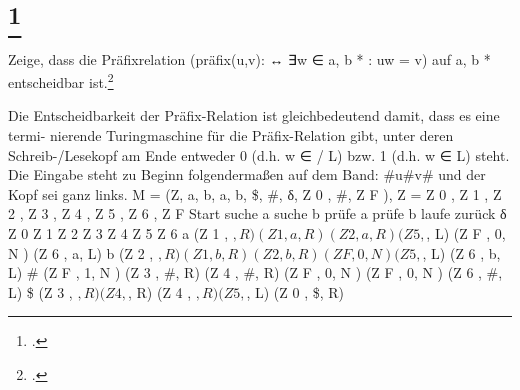 \documentclass{bschlangaul-aufgabe}
\begin{document}
\liAufgabenTitel{}
\section{
\footcite{66112:2002:03}}

Zeige, dass die Präﬁxrelation (präﬁx(u,v): ↔ ∃w ∈ {a, b} * : uw = v) auf {a, b} *
entscheidbar ist.\footcite[Aufgabe 7a)]{theo:ab:4}

Die Entscheidbarkeit der Präﬁx-Relation ist gleichbedeutend damit, dass es eine termi-
nierende Turingmaschine für die Präﬁx-Relation gibt, unter deren Schreib-/Lesekopf am
Ende entweder 0 (d.h. w ∈
/ L) bzw. 1 (d.h. w ∈ L) steht.
Die Eingabe steht zu Beginn folgendermaßen auf dem Band: \#u\#v\# und der Kopf sei
ganz links.
M = (Z, {a, b}, {a, b, \$, \#}, δ, Z 0 , \#, {Z F }), Z = {Z 0 , Z 1 , Z 2 , Z 3 , Z 4 , Z 5 , Z 6 , Z F }
Start
suche a
suche b
prüfe a
prüfe b
laufe zurück
δ
Z 0
Z 1
Z 2
Z 3
Z 4
Z 5
Z 6
a (Z 1 , $, R) (Z 1 , a, R) (Z 2 , a, R)
(Z 5 , $, L) (Z F , 0, N )
(Z 6 , a, L)
b (Z 2 , $, R)
(Z 1 , b, R)
(Z 2 , b, R) (Z F , 0, N ) (Z 5 , $, L)
(Z 6 , b, L)
\# (Z F , 1, N ) (Z 3 , \#, R) (Z 4 , \#, R) (Z F , 0, N ) (Z F , 0, N ) (Z 6 , \#, L)
\$
(Z 3 , $, R) (Z 4 , $, R) (Z 4 , $, R) (Z 5 , $, L) (Z 0 , \$, R)
\end{document}
